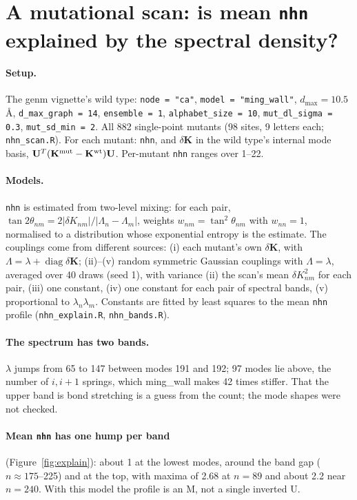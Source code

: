 \documentclass[11pt]{article}
\newcommand{\KK}{\mathbf{K}}
\newcommand{\dK}{\delta\KK}
\newcommand{\code}[1]{\texttt{#1}}
\begin{document}
\section{A mutational scan: is mean \code{nhn} explained by the spectral density?}

\paragraph{Setup.} The genm vignette's wild type: \code{node = "ca"}, \code{model = "ming\_wall"},
$d_{\max}=10.5$\,\AA, \code{d\_max\_graph = 14}, \code{ensemble = 1}, \code{alphabet\_size = 10},
\code{mut\_dl\_sigma = 0.3}, \code{mut\_sd\_min = 2}. All 882 single-point mutants (98 sites,
9 letters each; \code{nhn\_scan.R}). For each mutant: \code{nhn}, and
$\dK$ in the wild type's internal mode basis, $\mathbf{U}^T(\KK^{\rm mut}-\KK^{\rm wt})\mathbf{U}$.
Per-mutant \code{nhn} ranges over 1--22.

\paragraph{Models.} \code{nhn} is estimated from two-level mixing: for each pair,
$\tan2\theta_{nm}=2|\delta K_{nm}|/|\Lambda_n-\Lambda_m|$, weights $w_{nm}=\tan^2\theta_{nm}$ with
$w_{nn}=1$, normalised to a distribution whose exponential entropy is the estimate.
The couplings come from different sources:
(i) each mutant's own $\dK$, with $\Lambda=\lambda+\operatorname{diag}\dK$;
(ii)--(v) random symmetric Gaussian couplings with $\Lambda=\lambda$, averaged over 40 draws
(seed 1), with variance (ii) the scan's mean $\delta K_{nm}^2$ for each pair, (iii) one constant,
(iv) one constant for each pair of spectral bands, (v) proportional to $\lambda_n\lambda_m$.
Constants are fitted by least squares to the mean \code{nhn} profile (\code{nhn\_explain.R},
\code{nhn\_bands.R}).

\paragraph{The spectrum has two bands.} $\lambda$ jumps from 65 to 147 between modes 191 and 192;
97 modes lie above, the number of $i,i+1$ springs, which ming\_wall makes 42 times stiffer.
That the upper band is bond stretching is a guess from the count; the mode shapes were not checked.

\paragraph{Mean \code{nhn} has one hump per band} (Figure~\ref{fig:explain}): about 1 at the lowest
modes, around the band gap ($n\approx175$--225) and at the top, with maxima of 2.68 at $n=89$ and
about 2.2 near $n=240$. With this model the profile is an M, not a single inverted U.
\end{document}
